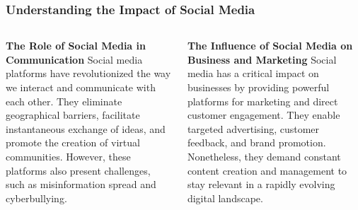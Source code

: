 \documentclass[5pt]{beamer}
\begin{document}
\begin{frame}
\frametitle{Understanding the Impact of Social Media}
\begin{columns}
\begin{column}{0.45\textwidth}
\begin{block}{\textbf{The Role of Social Media in Communication}}
Social media platforms have revolutionized the way we interact and communicate with each other. They eliminate geographical barriers, facilitate instantaneous exchange of ideas, and promote the creation of virtual communities. However, these platforms also present challenges, such as misinformation spread and cyberbullying.
\end{block}
\end{column}
\begin{column}{0.45\textwidth}
\begin{block}{\textbf{The Influence of Social Media on Business and Marketing}}
Social media has a critical impact on businesses by providing powerful platforms for marketing and direct customer engagement. They enable targeted advertising, customer feedback, and brand promotion. Nonetheless, they demand constant content creation and management to stay relevant in a rapidly evolving digital landscape.
\end{block}
\end{column}
\end{columns}
\end{frame}
\end{document}
